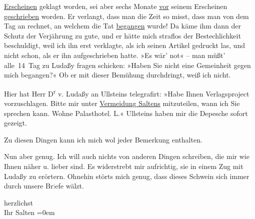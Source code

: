                   \uline{Erscheinen} geklagt worden, sei aber sechs Monate
                  \uline{vor} seinem Erscheinen \uline{geschrieben} worden. Er verlangt, dass man die Zeit so misst, dass man von
               dem Tag an rechnet, an welchem die Tat \uline{begangen}
               wurde! Da käme ihm dann der Schutz der Verjährung zu gute, und er hätte mich straflos
               der Bestechlichkeit beschuldigt, weil ich ihn erst verklagte, als ich seinen Artikel gedruckt las, und
               nicht schon, als er ihn aufgeschrieben hatte. »Es wär’ not« – man müßt’ alle 14 Tag
               zu Ludaßy fragen schicken: »Haben Sie nicht
               eine Gemeinheit gegen mich begangen?« Ob er mit dieser Bemühung durchdringt, weiß ich
               nicht.\pend
           
\pstart
           Hier hat Herr D\textsuperscript{r}{ }v. Ludaßy an Ullsteins telegrafirt: »Habe Ihnen Verlagsproject vorzuschlagen. Bitte mir
               unter \uline{Vermeidung Saltens} mitzuteilen, wann ich Sie
               sprechen kann. Wohne Palasthotel. L.« Ullsteins haben mir die Depesche sofort gezeigt.\pend
           
\pstart
           Zu diesen Dingen kann ich mich wol jeder Bemerkung enthalten.\pend
           
\pstart
           Nun aber genug. Ich will auch nichts von anderen Dingen {\pb}schreiben, die mir wie Ihnen
               näher u. lieber sind. Es widerstrebt mir aufrichtig, sie in einem Zug mit Ludaßy zu erörtern. Ohnehin störts mich genug,
               dass dieses Schwein sich immer durch unsere Br\textcolor{gray}{i}efe wälzt.\pend
           
\pstart
           herzlichst {\\[\baselineskip]}Ihr \spacefill\mbox{Salten}\pend
           \leftskip=0em{}\endnumbering{}  \newcommand{\dateiname}{L03425}\newcommand{\titel}{Felix Salten an Arthur Schnitzler, 17. 5. 1906}\newcommand{\editorInnen}{Martin Anton Müller und Laura Untner}
